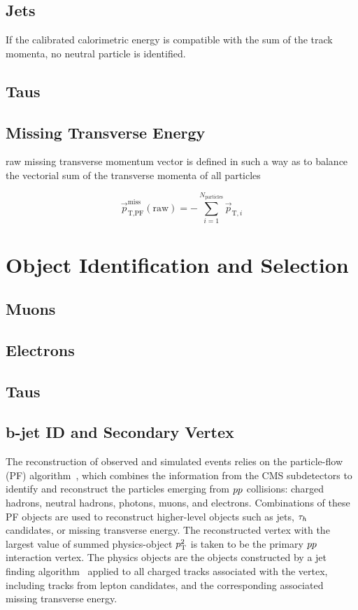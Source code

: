\subsection{Jets}

If the calibrated calorimetric energy is compatible with the sum of the track momenta, no neutral particle is identified.



\subsection{Taus}
\subsection{Missing Transverse Energy}

raw missing transverse momentum vector is defined in such a way as to balance the vectorial sum of the transverse momenta of all particles

\begin{equation}
\vec{p}^{\text{miss}}_{\text{T,PF}}(\text{raw}) = - \sum^{N_{\text{particles}}}_{i=1} \vec{p}_{\text{T},i}
\end{equation}

\pagebreak
\section{Object Identification and Selection}
\subsection{Muons}
\subsection{Electrons}
\subsection{Taus}
\subsection{b-jet ID and Secondary Vertex}





The reconstruction of observed and simulated events relies on the particle-flow (PF) algorithm~\cite{Sirunyan:2017ulk},
which combines the information from the CMS subdetectors to identify
and reconstruct the particles emerging from $pp$ collisions:
charged hadrons, neutral hadrons, photons, muons, and electrons.
Combinations of these PF objects are used to reconstruct
higher-level objects such as jets, $\tau_{h}$ candidates, or
missing transverse energy.
The reconstructed vertex with the largest value of summed physics-object $p_\mathrm{T}^2$ is taken to be the primary $pp$ interaction vertex. The physics objects are the objects constructed by a jet finding algorithm~\cite{Cacciari:2008gp,Cacciari:2011ma} applied to all charged tracks associated with the vertex, including tracks from lepton candidates, and the corresponding associated missing transverse energy.

